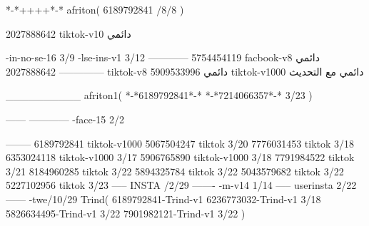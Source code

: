 *-*++++*-*
afriton(
6189792841 /8/8
)

2027888642 tiktok-v10
دائمي

-in-no-se-16 3/9
-lse-ins-v1 3/12
------------
5754454119 facbook-v8
دائمي
--------------
2027888642 tiktok-v8
دائمي
5909533996 tiktok-v1000
دائمي مع التحديث

__________
afriton1(
*-*6189792841*-*
*-*7214066357*-* 3/23
)


------
------------
-face-15 2/2

--------
6189792841 tiktok-v1000
5067504247 tiktok 3/20
7776031453 tiktok 3/18
6353024118 tiktok-v1000 3/17
5906765890 tiktok-v1000 3/18
7791984522 tiktok 3/21
8184960285 tiktok 3/22
5894325784 tiktok 3/22
5043579682 tiktok 3/22
5227102956 tiktok 3/23
-----
 INSTA /2/29
-------
-m-v14 1/14
-----
userinsta 2/22
------
-twe/10/29
Trind(
6189792841-Trind-v1 
6236773032-Trind-v1 3/18
5826634495-Trind-v1 3/22
7901982121-Trind-v1 3/22
)
